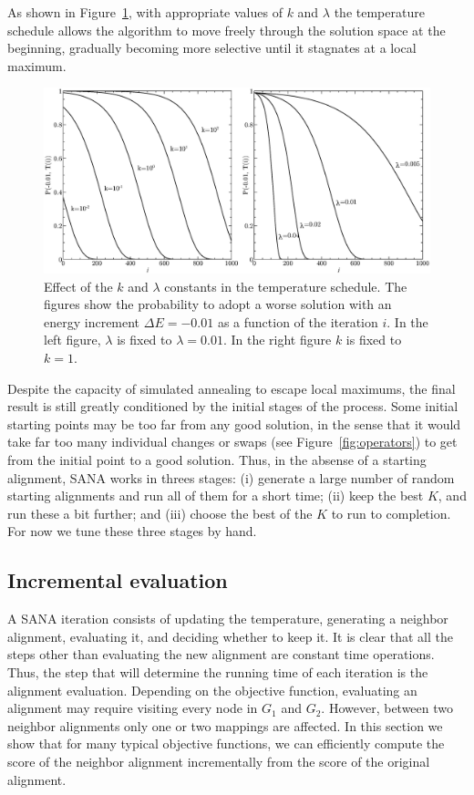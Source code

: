 \documentclass{bioinfo}
\begin{document}
\begin{methods}
As shown in Figure~\ref{fig:parameters}, with appropriate values of $k$ and $\lambda$ the temperature schedule allows the algorithm to move freely through the solution space at the beginning, gradually becoming more selective until it stagnates at a local maximum.

\begin{figure}
\centering
\includegraphics[width=0.99\linewidth]{./SA_parameters.eps}
\caption{Effect of the $k$ and $\lambda$ constants in the temperature schedule. The figures show the probability to adopt a worse solution with an energy increment $\Delta E = -0.01$ as a function of the iteration $i$. In the left figure, $\lambda$ is fixed to $\lambda=0.01$. In the right figure $k$ is fixed to $k=1$.}
\label{fig:parameters}
\end{figure}

Despite the capacity of simulated annealing to escape local maximums, the final result is still greatly conditioned by the initial stages of the process. Some initial starting points may be too far from any good solution, in the sense that it would take far too many individual changes or swaps (see Figure~\ref{fig:operators}) to get from the initial point to a good solution.
Thus, in the absense of a starting alignment, SANA works in threes stages: (i) generate a large number of random starting alignments and run all of them for a short time; (ii) keep the best $K$, and run these a bit further; and (iii) choose the best of the $K$ to run to completion.  For now we tune these three stages by hand.

\subsection{Incremental evaluation}\label{implementation}

A SANA iteration consists of updating the temperature, generating a neighbor alignment, evaluating it, and deciding whether to keep it. It is clear that all the steps other than evaluating the new alignment are constant time operations. Thus, the step that will determine the running time of each iteration is the alignment evaluation. Depending on the objective function, evaluating an alignment may require visiting every node in $G_1$ and $G_2$. However, between two neighbor alignments only one or two mappings are affected. In this section we show that for many typical objective functions, we can efficiently compute the score of the neighbor alignment incrementally from the score of the original alignment.


\end{methods}
\end{document}
